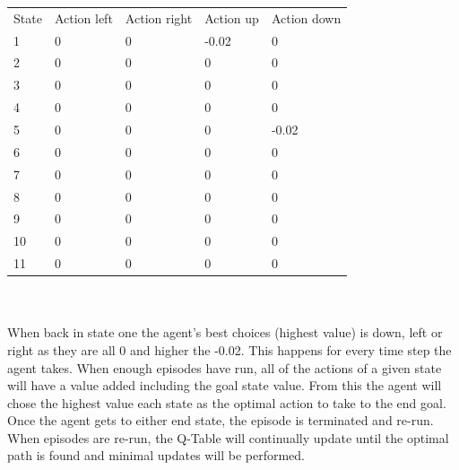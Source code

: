 \begin{tabular}{lllll}
State & Action left & Action right & Action up & Action down \\
1     & 0           & 0            & -0.02     & 0           \\
2     & 0           & 0            & 0         & 0           \\
3     & 0           & 0            & 0         & 0           \\
4     & 0           & 0            & 0         & 0           \\
5     & 0           & 0            & 0         & -0.02       \\
6     & 0           & 0            & 0         & 0           \\
7     & 0           & 0            & 0         & 0           \\
8     & 0           & 0            & 0         & 0           \\
9     & 0           & 0            & 0         & 0           \\
10    & 0           & 0            & 0         & 0           \\
11    & 0           & 0            & 0         & 0     
\end{tabular}
\\
\\
When back in state one the agent’s best choices (highest value) is down, left or right as they are all 0 and higher the -0.02. This happens for every time step the agent takes. When enough episodes have run, all of the actions of a given state will have a value added including the goal state value. From this the agent will chose the highest value each state as the optimal action to take to the end goal. 
Once the agent gets to either end state, the episode is terminated and re-run. When episodes are re-run, the Q-Table will continually update until the optimal path is found and minimal updates will be performed.\\

